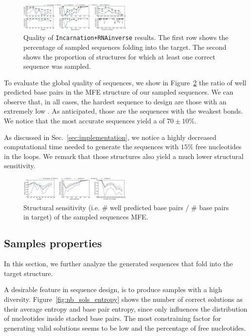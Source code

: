 \begin{figure}[ht!]	
	\centering
	\includegraphics[width=0.5\textwidth]{Figures/mfe_struct_solved}
	\caption{Quality of \texttt{Incarnation+RNAinverse} results. The first row shows the percentage
	of sampled sequences folding into the target. The second shows the 	
	proportion	of structures for which at least one correct sequence was 
	sampled.}
	\label{fig:mfe_struct_solved}	
\end{figure}
 
To evaluate the global quality of \ourprog sequences, we show
in Figure~\ref{fig:ss_sens} the ratio of well predicted base pairs in the
MFE structure of our sampled sequences. We can observe that, in all cases,
the hardest sequence to design are those with an extremely low \GCContent. As anticipated, those are the sequences with the weakest bonds.
We notice that the most accurate sequences yield a \GCContent
of $70\pm 10\%$. 

As discussed in Sec.~\ref{sec:implementation}, we notice a highly decreased
computational time needed to generate the sequences with $15\%$ free 
nucleotides in the loops. We remark that those structures also yield 
a much lower structural sensitivity.

\begin{figure}[ht!]
 	\centering
	\includegraphics[width=0.5\textwidth]{Figures/rnastrand_clustered_rnainverse_100samples_struct_sens.png}
	\caption{Structural sensitivity (i.e. $\#$ well predicted base pairs / $\#$ base pairs in target) of the sampled sequences MFE. }
	\label{fig:ss_sens}	
\end{figure}


\subsection{Samples properties}

In this section, we further analyze the generated sequences that fold into the 
target structure. 

A desirable feature in sequence design, is to produce samples with a high
diversity. Figure~\ref{fig:nb_sols_entropy} shows the number of correct
solutions as their average entropy and base pair entropy, since 
\ourprog  only influences the distribution of nucleotides inside 
stacked base pairs. The most constraining factor for generating valid
 solutions seems to be  low \GCContent and the percentage of free nucleotides. 

